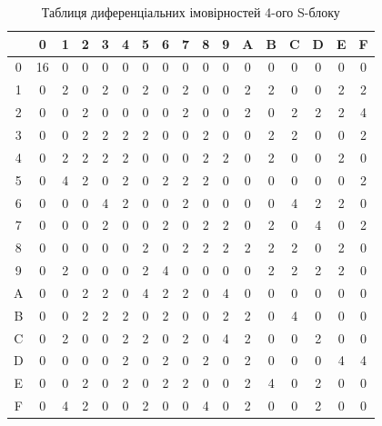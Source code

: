 \documentclass[12pt,a4paper]{article}
\begin{document}
\begin{table}[h!]
\centering
\begin{tabular}{|c|c|c|c|c|c|c|c|c|c|c|c|c|c|c|c|c|}
\hline
\backslashbox{$\alpha$}{$\beta$}  & 0  & 1 & 2 & 3 & 4 & 5 & 6 & 7 & 8 & 9 & A & B & C & D & E & F \\ \hline
0 & 16 & 0 & 0 & 0 & 0 & 0 & 0 & 0 & 0 & 0 & 0 & 0 & 0 & 0 & 0 & 0 \\ \hline
1 & 0  & 2 & 0 & 2 & 0 & 2 & 0 & 2 & 0 & 0 & 2 & 2 & 0 & 0 & 2 & 2 \\ \hline
2 & 0  & 0 & 2 & 0 & 0 & 0 & 0 & 2 & 0 & 0 & 2 & 0 & 2 & 2 & 2 & 4 \\ \hline
3 & 0  & 0 & 2 & 2 & 2 & 2 & 0 & 0 & 2 & 0 & 0 & 2 & 2 & 0 & 0 & 2 \\ \hline
4 & 0  & 2 & 2 & 2 & 2 & 0 & 0 & 0 & 2 & 2 & 0 & 2 & 0 & 0 & 2 & 0 \\ \hline
5 & 0  & 4 & 2 & 0 & 2 & 0 & 2 & 2 & 2 & 0 & 0 & 0 & 0 & 0 & 0 & 2 \\ \hline
6 & 0  & 0 & 0 & 4 & 2 & 0 & 0 & 2 & 0 & 0 & 0 & 0 & 4 & 2 & 2 & 0 \\ \hline
7 & 0  & 0 & 0 & 2 & 0 & 0 & 2 & 0 & 2 & 2 & 0 & 2 & 0 & 4 & 0 & 2 \\ \hline
8 & 0  & 0 & 0 & 0 & 0 & 2 & 0 & 2 & 2 & 2 & 2 & 2 & 2 & 0 & 2 & 0 \\ \hline
9 & 0  & 2 & 0 & 0 & 0 & 2 & 4 & 0 & 0 & 0 & 0 & 2 & 2 & 2 & 2 & 0 \\ \hline
A & 0  & 0 & 2 & 2 & 0 & 4 & 2 & 2 & 0 & 4 & 0 & 0 & 0 & 0 & 0 & 0 \\ \hline
B & 0  & 0 & 2 & 2 & 2 & 0 & 2 & 0 & 0 & 2 & 2 & 0 & 4 & 0 & 0 & 0 \\ \hline
C & 0  & 2 & 0 & 0 & 2 & 2 & 0 & 2 & 0 & 4 & 2 & 0 & 0 & 2 & 0 & 0 \\ \hline
D & 0  & 0 & 0 & 0 & 2 & 0 & 2 & 0 & 2 & 0 & 2 & 0 & 0 & 0 & 4 & 4 \\ \hline
E & 0  & 0 & 2 & 0 & 2 & 0 & 2 & 2 & 0 & 0 & 2 & 4 & 0 & 2 & 0 & 0 \\ \hline
F & 0  & 4 & 2 & 0 & 0 & 2 & 0 & 0 & 4 & 0 & 2 & 0 & 0 & 2 & 0 & 0 \\ \hline
\end{tabular}
\caption{Таблиця диференціальних імовірностей 4-ого S-блоку}
\label{tab:sBoxDiffTab}
\end{table}
\end{document}
